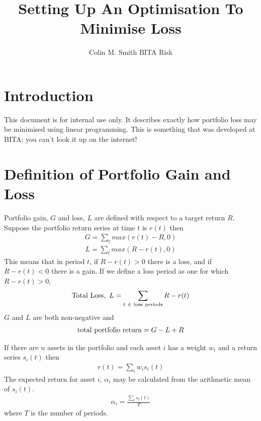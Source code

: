 \documentclass[12pt]{article}
\title{Setting Up An Optimisation To Minimise Loss}
\author{Colin M. Smith BITA Risk}
\begin{document}
\maketitle
\tableofcontents
\pagebreak
\doublespacing
\section{Introduction}
This document is for internal use only. It describes exactly how portfolio loss may be minimised
using linear programming. This is something that was developed at BITA; you can't look it up on the internet!
\section{Definition of Portfolio Gain and Loss}
Portfolio gain, $G$ and loss, $L$ are defined with respect to a target return $R$. Suppose the portfolio return
series at time $t$ is $r(t)$ then
\begin{eqnarray}
    G = \sum_t max(r(t) - R,0)
\end{eqnarray}
\begin{eqnarray}
    L = \sum_t max(R-r(t),0)
\end{eqnarray}
This means that in period $t$, if $R-r(t) > 0$ there is a loss, and if $R-r(t) < 0$ there is a gain.
If we define a loss period as one for which $R-r(t) > 0$,
\begin{eqnarray}
  {\rm Total\ Loss},\ L= \sum_{t\ \in\ \rm loss\ periods} R-r(t)
\end{eqnarray}
$G$ and $L$ are both non-negative and
\begin{eqnarray}
 {\rm   total\ portfolio\ return}= G - L + R
\end{eqnarray}

If there are $n$ assets in the portfolio and each asset $i$
has a weight $w_i$ and a return series $s_i (t)$ then
\begin{eqnarray}
    r(t) = \sum_i w_i s_i(t)
\end{eqnarray}
The expected return for asset $i$, $\alpha_i$ may be calculated from the arithmetic
mean of $s_i(t)$.
\begin{eqnarray}
    \alpha_i = \frac{\sum_t s_i(t)} {T} 
\end{eqnarray}
where $T$ is the number of periods.
\end{document}
